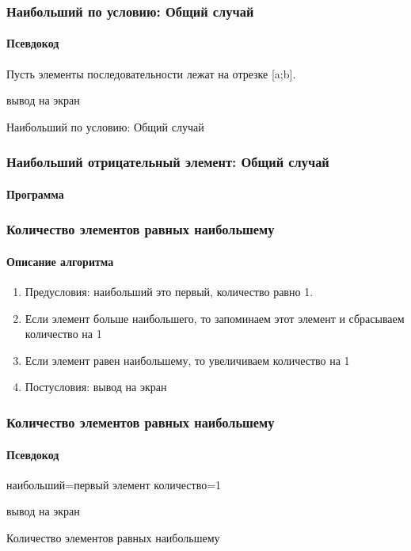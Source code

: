 \begin{frame}[fragile]
\frametitle{Наибольший по условию: Общий случай}
\framesubtitle{Псевдокод}
\small
Пусть элементы последовательности лежат на отрезке [a;b]. 
\begin{algorithm}[H]
		\SetAlgoLined
	
	вывод на экран\;
	\caption{Наибольший по условию: Общий случай}
\end{algorithm}


\end{frame}


\begin{frame}[fragile]
\frametitle{Наибольший отрицательный элемент: Общий случай}
\framesubtitle{Программа}


\end{frame}


\begin{frame}[fragile]
\frametitle{Количество элементов равных наибольшему}
\framesubtitle{Описание алгоритма}

\begin{enumerate}
	\item Предусловия: наибольший это первый, количество равно 1.
	\item Если элемент больше наибольшего, то запоминаем этот элемент и сбрасываем количество на 1
	\item Если элемент равен наибольшему, то увеличиваем количество на 1
	\item Постусловия: вывод на экран
	
\end{enumerate}

\end{frame}

\begin{frame}[fragile]
\frametitle{Количество элементов равных наибольшему}
\framesubtitle{Псевдокод}
\small
\begin{algorithm}[H]
		\SetAlgoLined
		наибольший=первый элемент\;
		количество=1\;
	
	вывод на экран\;
	\caption{Количество элементов равных наибольшему}
\end{algorithm}


\end{frame}


